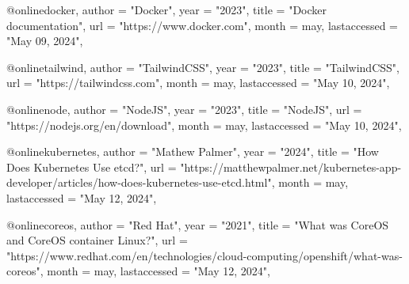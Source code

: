 @online{docker,
  author =       "Docker",
  year =         "2023",
  title =        "Docker documentation",
  url =          "https://www.docker.com",
  month =        may,
  lastaccessed = "May 09, 2024",
}

@online{tailwind,
  author =       "TailwindCSS",
  year =         "2023",
  title =        "TailwindCSS",
  url =          "https://tailwindcss.com",
  month =        may,
  lastaccessed = "May 10, 2024",
}

@online{node,
  author =       "NodeJS",
  year =         "2023",
  title =        "NodeJS",
  url =          "https://nodejs.org/en/download",
  month =        may,
  lastaccessed = "May 10, 2024",
}

@online{kubernetes,
  author =       "Mathew Palmer",
  year =         "2024",
  title =        "How Does Kubernetes Use etcd?",
  url =          "https://matthewpalmer.net/kubernetes-app-developer/articles/how-does-kubernetes-use-etcd.html",
  month =        may,
  lastaccessed = "May 12, 2024",
}

@online{coreos,
  author =       "Red Hat",
  year =         "2021",
  title =        "What was CoreOS and CoreOS container Linux?",
  url =          "https://www.redhat.com/en/technologies/cloud-computing/openshift/what-was-coreos",
  month =        may,
  lastaccessed = "May 12, 2024",
}
